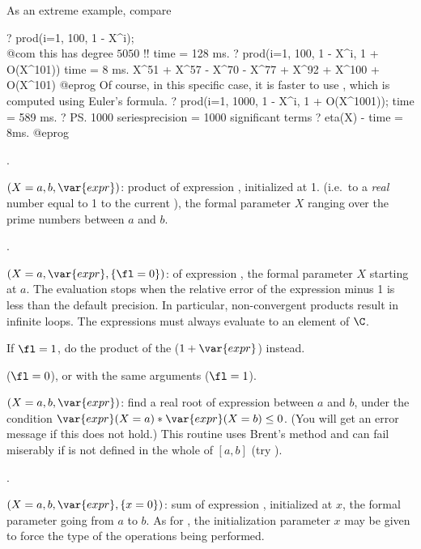 \noindent As an extreme example, compare

\bprog
? prod(i=1, 100, 1 - X^i);  \\@com this has degree $5050$ !!
time = 128 ms.
? prod(i=1, 100, 1 - X^i, 1 + O(X^101))
time = 8 ms.
X^51 + X^57 - X^70 - X^77 + X^92 + X^100 + O(X^101)
@eprog\noindent
Of course, in  this specific case, it is faster to use ,
which is computed using Euler's formula.
\bprog
? prod(i=1, 1000, 1 - X^i, 1 + O(X^1001));
time = 589 ms.
? \ps1000
seriesprecision = 1000 significant terms
? eta(X) - %
time = 8ms.
@eprog

.

$(X=a,b,\var{expr})$: \label{se:prodeuler}product of expression ,
initialized at 1. (i.e.~to a \emph{real} number equal to 1 to the current
), the formal parameter $X$ ranging over the prime numbers
between $a$ and $b$.

.

$(X=a,\var{expr},\{\fl=0\})$: \label{se:prodinf} of
expression , the formal parameter $X$ starting at $a$. The evaluation
stops when the relative error of the expression minus 1 is less than the
default precision. In particular, non-convergent products result in infinite
loops. The expressions must always evaluate to an element of $\C$.

If $\fl=1$, do the product of the ($1+\var{expr}$) instead.

($\fl=0$), or  with the same arguments ($\fl=1$).

$(X=a,b,\var{expr})$: \label{se:solve}find a real root of expression
 between $a$ and $b$, under the condition
$\var{expr}(X=a) * \var{expr}(X=b) \le 0$. (You will get an error message
 if this does not hold.)
This routine uses Brent's method and can fail miserably if  is
not defined in the whole of $[a,b]$ (try ).

.

$(X=a,b,\var{expr},\{x=0\})$: \label{se:sum}sum of expression ,
initialized at $x$, the formal parameter going from $a$ to $b$. As for
, the initialization parameter $x$ may be given to force the type
of the operations being performed.

